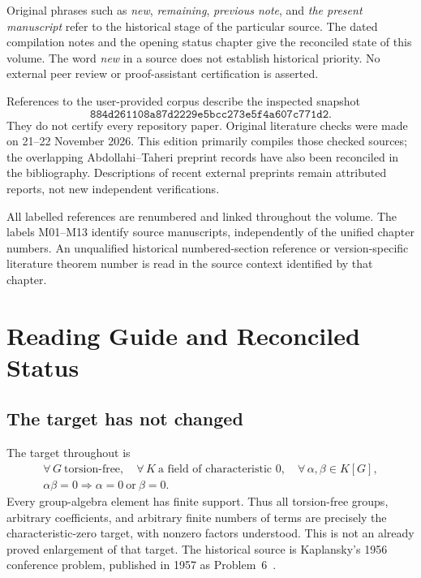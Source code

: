 \documentclass[11pt,a4paper,oneside]{report}
\theoremstyle{definition}
\theoremstyle{remark}
\begin{document}
Original phrases such as \emph{new}, \emph{remaining},
\emph{previous note}, and \emph{the present manuscript} refer to the
historical stage of the particular source. The dated compilation notes
and the opening status chapter give the reconciled state of this volume.
The word \emph{new} in a source does not establish historical priority.
No external peer review or proof-assistant certification is asserted.

References to the user-provided corpus describe the inspected snapshot
\[
\texttt{884d261108a87d2229e5bcc273e5f4a607c771d2}.
\]
They do not certify every repository paper. Original literature checks were made on
21--22 November 2026. This edition primarily compiles those checked
sources; the overlapping Abdollahi--Taheri preprint records have also
been reconciled in the bibliography. Descriptions of recent external
preprints remain attributed reports, not new independent verifications.

All labelled references are renumbered and linked throughout the
volume. The labels M01--M13 identify source manuscripts,
independently of the unified chapter numbers. An unqualified historical
numbered-section reference or version-specific literature theorem
number is read in the source context identified by that chapter.

\tableofcontents
\clearpage
{}
\chapter{Reading Guide and Reconciled Status}\label{chap:guide}
\section{The target has not changed}
The target throughout is
\begin{equation}\label{compiled:target}
\begin{gathered}
\forall\,G\ \text{torsion-free},\quad
\forall\,K\ \text{a field of characteristic }0,\quad
\forall\,\alpha,\beta\in K[G],\\
\alpha\beta=0\Longrightarrow \alpha=0\ \text{or}\ \beta=0.
\end{gathered}
\end{equation}
Every group-algebra element has finite support. Thus all torsion-free
groups, arbitrary coefficients, and arbitrary finite numbers of terms
are precisely the characteristic-zero target, with nonzero factors
understood. This is not an already proved enlargement of that target.
The historical source is Kaplansky's 1956 conference problem,
published in 1957 as Problem~6~\cite{B:Kaplansky}.
\end{document}
